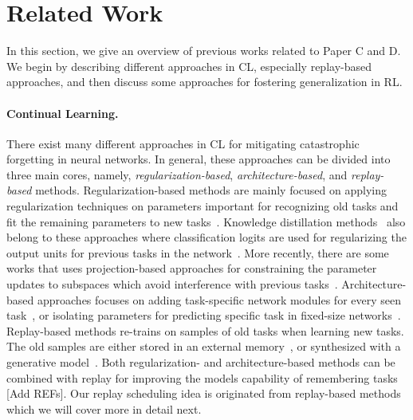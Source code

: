 \section{Related Work}\label{ch4/sec:related_work}

In this section, we give an overview of previous works related to Paper C and D. We begin by describing different approaches in CL, especially replay-based approaches, and then discuss some approaches for fostering generalization in RL.

\vspace{-3mm}
\paragraph{Continual Learning.} There exist many different approaches in CL for mitigating catastrophic forgetting in neural networks. In general, these approaches can be divided into three main cores, namely, \textit{regularization-based}, \textit{architecture-based}, and \textit{replay-based} methods. Regularization-based methods are mainly focused on applying regularization techniques on parameters important for recognizing old tasks and fit the remaining parameters to new tasks~\cite{kirkpatrick2017overcoming, zenke2017continual, nguyen2017variational}. Knowledge distillation methods~\cite{hinton2015distilling} also belong to these approaches where classification logits are used for regularizing the output units for previous tasks in the network~\cite{li2017learning, schwarz2018progress}. More recently, there are some works that uses projection-based approaches for constraining the parameter updates to subspaces which avoid interference with previous tasks~\cite{saha2021gradient, kao2021natural}. Architecture-based approaches focuses on adding task-specific network modules for every seen task~\cite{rusu2016progressive, yoon2017lifelong, yoon2019scalable, ebrahimi2020adversarial}, or isolating parameters for predicting specific task in fixed-size networks~\cite{mallya2018packnet, serra2018overcoming, schwarz2021powerpropagation}. Replay-based methods re-trains on samples of old tasks when learning new tasks. The old samples are either stored in an external memory~\cite{chaudhry2019tiny, hayes2020remind, rolnick2018experience}, or synthesized with a generative model~\cite{shi2019variational, van2018generative, van2020brain, wu2018memory}. Both regularization- and architecture-based methods can be combined with replay for improving the models capability of remembering tasks [Add REFs]. Our replay scheduling idea is originated from replay-based methods which we will cover more in detail next. 

